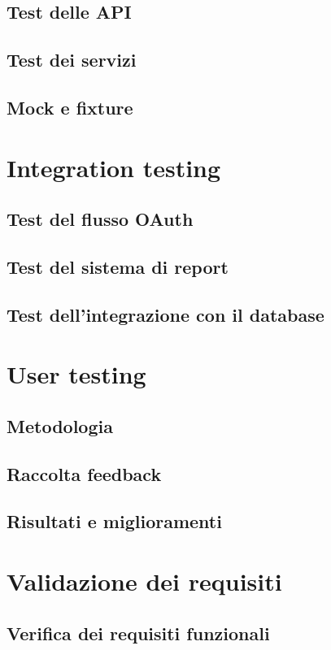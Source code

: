 \documentclass[12pt,a4paper,oneside]{report}
\begin{document}
\subsection{Test delle API}
\subsection{Test dei servizi}
\subsection{Mock e fixture}

\section{Integration testing}
\subsection{Test del flusso OAuth}
\subsection{Test del sistema di report}
\subsection{Test dell'integrazione con il database}

\section{User testing}
\subsection{Metodologia}
\subsection{Raccolta feedback}
\subsection{Risultati e miglioramenti}

\section{Validazione dei requisiti}
\subsection{Verifica dei requisiti funzionali}
\end{document}
